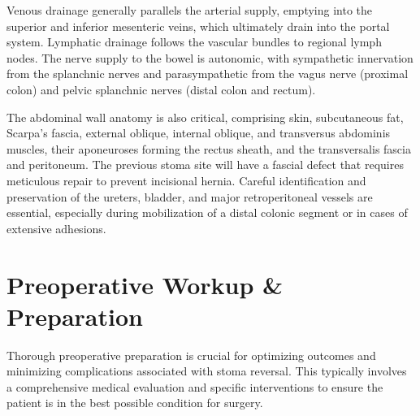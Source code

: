 Venous drainage generally parallels the arterial supply, emptying into the superior and inferior mesenteric veins, which ultimately drain into the portal system. Lymphatic drainage follows the vascular bundles to regional lymph nodes. The nerve supply to the bowel is autonomic, with sympathetic innervation from the splanchnic nerves and parasympathetic from the vagus nerve (proximal colon) and pelvic splanchnic nerves (distal colon and rectum). 

The abdominal wall anatomy is also critical, comprising skin, subcutaneous fat, Scarpa's fascia, external oblique, internal oblique, and transversus abdominis muscles, their aponeuroses forming the rectus sheath, and the transversalis fascia and peritoneum. The previous stoma site will have a fascial defect that requires meticulous repair to prevent incisional hernia. Careful identification and preservation of the ureters, bladder, and major retroperitoneal vessels are essential, especially during mobilization of a distal colonic segment or in cases of extensive adhesions.

\section*{Preoperative Workup \& Preparation}
Thorough preoperative preparation is crucial for optimizing outcomes and minimizing complications associated with stoma reversal. This typically involves a comprehensive medical evaluation and specific interventions to ensure the patient is in the best possible condition for surgery.

